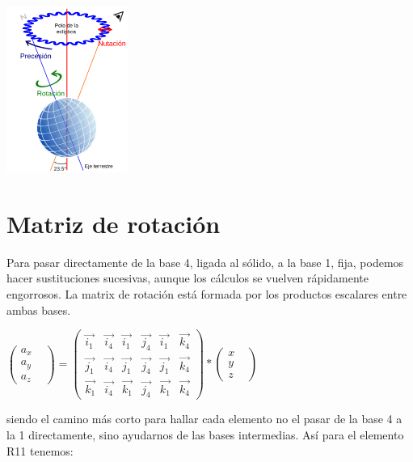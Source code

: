 \documentclass[12pt,a4paper]{report}
\begin{document}
\begin{center}
\includegraphics[width=4cm]{8.png} 
\end{center} 
\section{Matriz de rotación}
Para pasar directamente de la base 4, ligada al sólido, a la base 1, fija, podemos hacer sustituciones sucesivas, aunque los cálculos se vuelven rápidamente engorrosos. La matrix de rotación está formada por los productos escalares entre ambas bases.
\begin{center}
$\begin{pmatrix}
 a_{x} &\\ 
 a_{y} &\\
 a_{z} &
 \end{pmatrix}=\begin{pmatrix}
 {\overrightarrow{i_{1}}} & {\overrightarrow{i_{4}}} & {\overrightarrow{i_{1}}}& {\overrightarrow{j_{4}}}& {\overrightarrow{i_{1}}}& {\overrightarrow{k_{4}}}\\ 
 {\overrightarrow{j_{1}}} & {\overrightarrow{i_{4}}} & {\overrightarrow{j_{1}}}& {\overrightarrow{j_{4}}}& {\overrightarrow{j_{1}}}& {\overrightarrow{k_{4}}}\\ 
 {\overrightarrow{k_{1}}} & {\overrightarrow{i_{4}}} & {\overrightarrow{k_{1}}}& {\overrightarrow{j_{4}}}& {\overrightarrow{k_{1}}}& {\overrightarrow{k_{4}}}
 \end{pmatrix}*\begin{pmatrix}
 {x}&\\ 
 {y}&\\
 {z}&
 \end{pmatrix}$
\end{center}
siendo el camino más corto para hallar cada elemento no el pasar de la base 4 a la 1 directamente, sino ayudarnos de las bases intermedias. Así para el elemento R11 tenemos:
\end{document}
